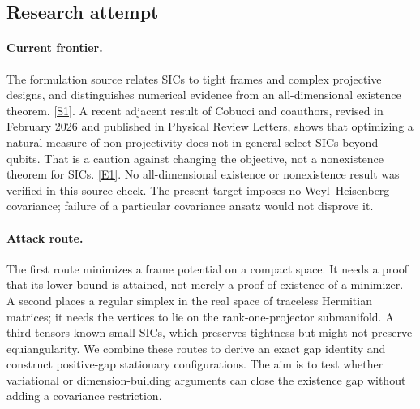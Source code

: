 \documentclass[11pt,a4paper]{article}
\newcommand{\sref}[2]{\hyperlink{source:#1:#2}{[S#2]}}
\newcommand{\eref}[2]{\hyperlink{extra:#1:#2}{[E#2]}}
\numberwithin{equation}{section}
\begin{document}
\subsection{Research attempt}

\paragraph{Current frontier.}
The formulation source relates SICs to tight frames and complex
projective designs, and distinguishes numerical evidence from an
all-dimensional existence theorem. \sref{231}{1}.
A recent adjacent result of Cobucci and coauthors, revised in February
2026 and published in Physical Review Letters, shows that optimizing a
natural measure of non-projectivity does not in general select SICs
beyond qubits. That is a caution against changing the objective, not a
nonexistence theorem for SICs. \eref{231}{1}.
No all-dimensional existence or nonexistence result was verified in this
source check. The present target imposes no Weyl--Heisenberg covariance;
failure of a particular covariance ansatz would not disprove it.

\paragraph{Attack route.}
The first route minimizes a frame potential on a compact space. It needs
a proof that its lower bound is attained, not merely a proof of existence
of a minimizer. A second places a regular simplex in the real space of
traceless Hermitian matrices; it needs the vertices to lie on the
rank-one-projector submanifold. A third tensors known small SICs, which
preserves tightness but might not preserve equiangularity. We combine
these routes to derive an exact gap identity and construct positive-gap
stationary configurations. The aim is to test whether variational or
dimension-building arguments can close the existence gap without adding
a covariance restriction.
\end{document}
